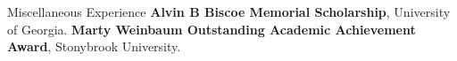 \begin{rubric}{Miscellaneous Experience}
\entry*[2023] \textbf{Alvin B Biscoe Memorial Scholarship}, University of Georgia.
\entry*[2019] \textbf{Marty Weinbaum Outstanding Academic Achievement Award}, Stonybrook University.
%

\end{rubric}
